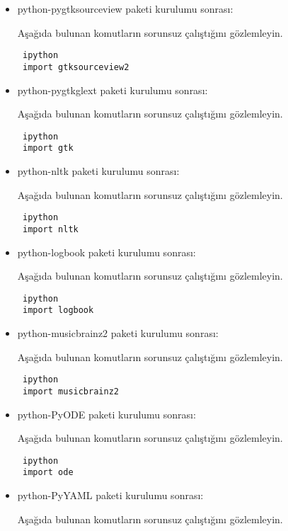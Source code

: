 \documentclass[a4paper,10pt]{article}
\begin{document}
\begin{itemize}
\item python-pygtksourceview paketi kurulumu sonrası:

Aşağıda bulunan komutların sorunsuz çalıştığını gözlemleyin.

\begin{verbatim}
 ipython
 import gtksourceview2
\end{verbatim}

\item python-pygtkglext paketi kurulumu sonrası:

Aşağıda bulunan komutların sorunsuz çalıştığını gözlemleyin.

\begin{verbatim}
 ipython
 import gtk
\end{verbatim}

\item python-nltk paketi kurulumu sonrası:

Aşağıda bulunan komutların sorunsuz çalıştığını gözlemleyin.

\begin{verbatim}
 ipython
 import nltk
\end{verbatim}

\item python-logbook paketi kurulumu sonrası:

Aşağıda bulunan komutların sorunsuz çalıştığını gözlemleyin.

\begin{verbatim}
 ipython
 import logbook
\end{verbatim}

\item python-musicbrainz2 paketi kurulumu sonrası:

Aşağıda bulunan komutların sorunsuz çalıştığını gözlemleyin.

\begin{verbatim}
 ipython
 import musicbrainz2
\end{verbatim}

\item python-PyODE paketi kurulumu sonrası:

Aşağıda bulunan komutların sorunsuz çalıştığını gözlemleyin.

\begin{verbatim}
 ipython
 import ode
\end{verbatim}

\item python-PyYAML paketi kurulumu sonrası:

Aşağıda bulunan komutların sorunsuz çalıştığını gözlemleyin.


\end{itemize}
\end{document}
